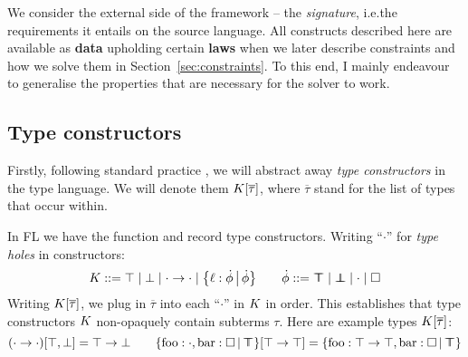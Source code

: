 We consider the external side of the \inference{} framework -- the \emph{signature}, i.e.\@ the requirements it entails on the source language. 
All constructs described here are available as \textbf{data} upholding certain \textbf{laws} when we later describe constraints and how we solve them in Section~\ref{sec:constraints}. To this end, I mainly endeavour to generalise the properties that are necessary for the \mlstruct{} solver to work.

\subsection{Type constructors}

Firstly, following standard practice \cite{essence-of-ml-type-inference, constraint-based-freeze-ml}, we will abstract away \emph{type constructors} in the type language. We will denote them $K[\overline \tau]$, where $\overline \tau$ stand for the list of types that occur within.
\begin{example}
    In FL we have the function and record type constructors. Writing \enquote{$\cdot$} for \emph{type holes} in constructors:
    $$
       \constr ::= \top \mid \bot \mid {\cdot} \to {\cdot} \mid \flext{\ell : \dot \phi}{\dot \phi} \qquad \dot \phi ::= \flftop \mid \flfbot \mid \cdot \mid \flabsent
    $$
    Writing $K[\overline \tau]$, we plug in $\overline \tau$ into each \enquote{$\cdot$} in $K$ in order. This establishes that type constructors $K$ non-opaquely contain subterms $\tau$. Here are example types $K[\overline \tau]$:
    $$
        (\cdot \to \cdot)[\top, \bot] = \top \to \bot \qquad \flext{\mathrm{foo}: \cdot, \mathrm{bar} : \flabsent}{\flftop}[\top \to \top] = \flext{\mathrm{foo}: \top \to \top, \mathrm{bar} : \flabsent}{\flftop}
    $$
\end{example}

